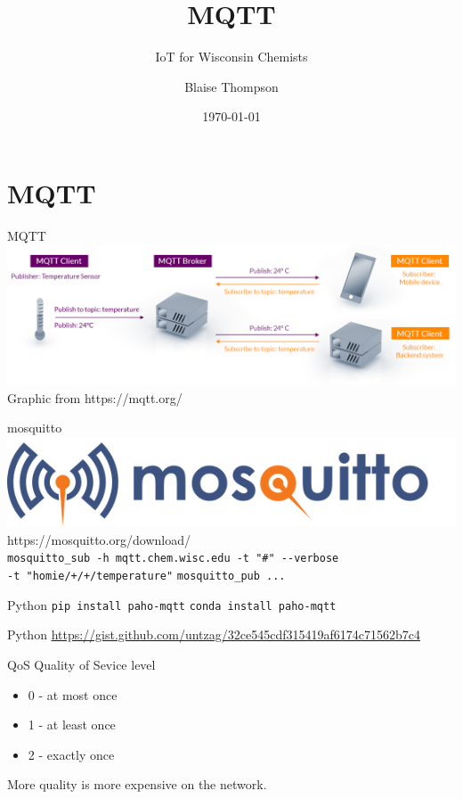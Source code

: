 \documentclass{presentation}
\title{MQTT}
\subtitle{IoT for Wisconsin Chemists}
\author{Blaise Thompson}
\institute{University of Wisconsin--Madison}
\date{\today}
\begin{document}
\maketitle

\section{MQTT}

\begin{frame}{MQTT}
  \includegraphics[width=\textwidth]{./mqtt-publish-subscribe.png}
  Graphic from https://mqtt.org/
\end{frame}

\begin{frame}{mosquitto}
  \includegraphics[width=\textwidth/4]{./mosquitto-text-side-28.png} \\
  https://mosquitto.org/download/ \\
  \vfill
  \texttt{mosquitto\_sub -h mqtt.chem.wisc.edu -t "\#" -{}-verbose} \\
  \vfill
  \texttt{-t "homie/+/+/temperature"}
  \vfill
  \texttt{mosquitto\_pub ...}
  \vfill
\end{frame}

\begin{frame}{Python}
	\texttt{pip install paho-mqtt}
	\vfill
	\texttt{conda install paho-mqtt}
\end{frame}

\begin{frame}{Python}
	\url{https://gist.github.com/untzag/32ce545cdf315419af6174c71562b7c4}
\end{frame}

\begin{frame}{QoS}
  Quality of Sevice level
  \begin{itemize}
    \item{0 - at most once}
    \item{1 - at least once}
    \item{2 - exactly once}
  \end{itemize}
  More quality is more expensive on the network.
\end{frame}
\end{document}
